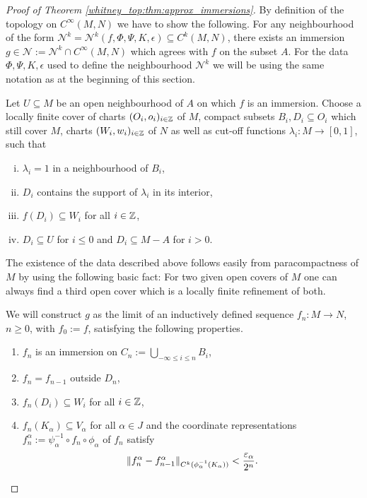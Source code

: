 \begin{proof}[Proof of Theorem \ref{whitney_top:thm:approx_immersions}]
    By definition of the topology on $C^\infty(M,N)$ we have to show the following. For any neighbourhood of the form $\mathcal{N}^k = \mathcal{N}^k(f,\Phi,\Psi,K,\epsilon) \subseteq C^k(M,N)$, there exists an immersion $g \in \mathcal{N} := \mathcal{N}^k \cap C^\infty(M,N)$ which agrees with $f$ on the subset $A$. For the data $\Phi, \Psi, K, \epsilon$ used to define the neighbourhood $\mathcal{N}^k$ we will be using the same notation as at the beginning of this section.
    
    Let $U \subseteq M$ be an open neighbourhood of $A$ on which $f$ is an immersion. Choose a locally finite cover of charts $(O_i,o_i)_{i\in \mathbb{Z}}$ of $M$, compact subsets $B_i, D_i \subseteq O_i$ which still cover $M$, charts $(W_i,w_i)_{i\in \mathbb{Z}}$ of $N$ as well as cut-off functions $\lambda_i \colon M \to [0,1]$, such that 
    \begin{enumerate}[(i)]
        \item \label{whitney_top:eq:immersion_cover_property1}$\lambda_i = 1$ in a neighbourhood of $B_i$,
        \item \label{whitney_top:eq:immersion_cover_property2}$D_i$ contains the support of $\lambda_i$ in its interior,
        \item $f(D_i) \subseteq W_i$ for all $i \in \mathbb{Z}$,
        \item \label{whitney_top:eq:immersion_cover_property4}$D_i \subseteq U$ for $i \leq 0$ and $D_i \subseteq M - A$ for $i >0$.
    \end{enumerate}
    The existence of the data described above follows easily from paracompactness of $M$ by using the following basic fact: For two given open covers of $M$ one can always find a third open cover which is a locally finite refinement of both.

    We will construct $g$ as the limit of an inductively defined sequence $f_n \colon M \to N$, $n \geq 0$, with $f_0 := f$, satisfying the following properties.

    \begin{enumerate}[1)]
        \item \label{whitney_top:eq:immersion_property_1} $f_n$ is an immersion on $C_n := \bigcup_{-\infty \leq i \leq n} B_i$,
        \item \label{whitney_top:eq:immersion_property_2} $f_n = f_{n-1}$ outside $D_n$,
        \item \label{whitney_top:eq:immersion_property_3} $f_n(D_i) \subseteq W_i$ for all $i \in \mathbb{Z}$,
        \item \label{whitney_top:eq:immersion_property_4} $f_n(K_\alpha) \subseteq V_\alpha$ for all $\alpha \in J$ and the coordinate representations $f_n^\alpha := \psi^{-1}_\alpha \circ f_n \circ \phi_\alpha$ of $f_n$ satisfy 
        \[
        \lVert f_n^\alpha - f_{n-1}^\alpha\rVert_{C^k(\phi_\alpha^{-1}(K_\alpha))} < \frac{\varepsilon_\alpha}{2^n}.
        \]
    \end{enumerate}


\end{proof}
